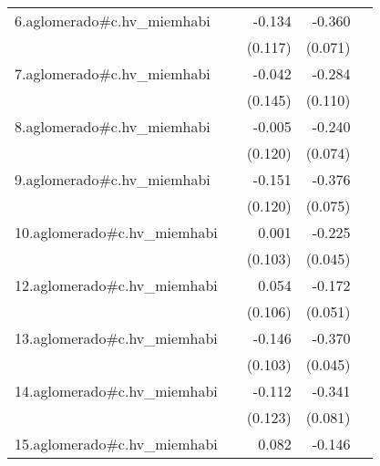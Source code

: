 {\begin{longtable}{l*{4}{D{.}{.}{-1}}}
\addlinespace
6.aglomerado#c.hv\_miemhabi&                     &      -0.134         &      -0.360\sym{***}&                     \\
            &                     &     (0.117)         &     (0.071)         &                     \\
\addlinespace
7.aglomerado#c.hv\_miemhabi&                     &      -0.042         &      -0.284\sym{*}  &                     \\
            &                     &     (0.145)         &     (0.110)         &                     \\
\addlinespace
8.aglomerado#c.hv\_miemhabi&                     &      -0.005         &      -0.240\sym{**} &                     \\
            &                     &     (0.120)         &     (0.074)         &                     \\
\addlinespace
9.aglomerado#c.hv\_miemhabi&                     &      -0.151         &      -0.376\sym{***}&                     \\
            &                     &     (0.120)         &     (0.075)         &                     \\
\addlinespace
10.aglomerado#c.hv\_miemhabi&                     &       0.001         &      -0.225\sym{***}&                     \\
            &                     &     (0.103)         &     (0.045)         &                     \\
\addlinespace
12.aglomerado#c.hv\_miemhabi&                     &       0.054         &      -0.172\sym{***}&                     \\
            &                     &     (0.106)         &     (0.051)         &                     \\
\addlinespace
13.aglomerado#c.hv\_miemhabi&                     &      -0.146         &      -0.370\sym{***}&                     \\
            &                     &     (0.103)         &     (0.045)         &                     \\
\addlinespace
14.aglomerado#c.hv\_miemhabi&                     &      -0.112         &      -0.341\sym{***}&                     \\
            &                     &     (0.123)         &     (0.081)         &                     \\
\addlinespace
15.aglomerado#c.hv\_miemhabi&                     &       0.082         &      -0.146\sym{*}  &                     \\

\end{longtable}}
